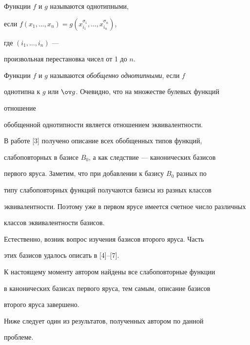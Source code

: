  


\noindent{}Функции $f$ и $g$ называются однотипными, 


если $f(x_1,\dotsc,x_n)=g(x^{\sigma_1}_{i_1},\dotsc,x^{\sigma_n}_{i_n})$, 


где $(i_1,\dotsc,i_n)$ --- 


произвольная перестановка чисел от 1 до $n$. 


 


Функции $f$ и $g$ называются {\it обобщенно однотипными}, если $f$ 


однотипна к $g$ или $\ov g$. Очевидно, что на множестве булевых функций 


отношение 


обобщенной однотипности является отношением эквивалентности. 


 


В работе [3] получено описание всех обобщенных типов функций, 


слабоповторных в базисе $B_0$, а как следствие --- канонических базисов 


первого яруса. Заметим, что при добавлении к базису $B_0$ разных по 


типу слабоповторных функций получаются базисы из разных классов 


эквивалентности. Поэтому уже в первом ярусе имеется счетное число различных 


классов эквивалентности базисов. 


 


Естественно, возник вопрос изучения базисов второго яруса. Часть 


этих базисов удалось описать в [4]--[7]. 


 


К настоящему моменту автором найдены все слабоповторные функции 


в канонических базисах первого яруса, тем самым, описание базисов 


второго яруса завершено. 


 


Ниже следует один из результатов, полученных автором по данной 


проблеме. 


 


